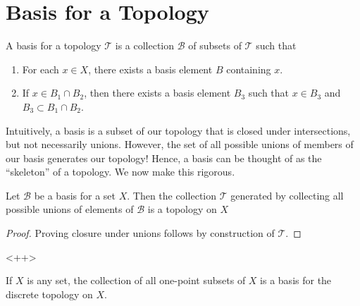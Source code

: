 \section{Basis for a Topology}
\begin{definition}
	\label{def:basis}
	A basis for a topology $\mathcal{T}$ is a collection $\mathcal{B}$ of subsets of 
	$\mathcal{T}$ such that
	\begin{enumerate}
		\item For each $x \in X$, there exists a basis element $B$ containing
			$x$. 
		\item If $x \in B_{1} \cap B_{2}$, then there exists a basis element
			$B_{3}$ such that $x \in B_{3}$ and $B_{3} \subset B_{1} \cap
			B_{2}$.
	\end{enumerate}
\end{definition}
Intuitively, a basis is a subset of our topology that is closed under
intersections, but not necessarily unions. However, the set of all possible
unions of members of our basis generates our topology!
Hence, a basis can be thought of as the ``skeleton'' of a topology.
We now make this rigorous.
\begin{theorem}
	\label{thm:basis-gen-topology}
	Let $\mathcal{B}$ be a basis for a set $X$. Then the collection $\mathcal{T}$ generated
	by collecting all possible unions of elements of $\mathcal{B}$ is a topology
	on $X$
\end{theorem}
\begin{proof}
	Proving closure under unions follows by construction of $\mathcal{T}$.

\end{proof}
<++>
\begin{example}
	If $X$ is any set, the collection of all one-point subsets of $X$
	is a basis for the discrete topology on $X$.
\end{example}


